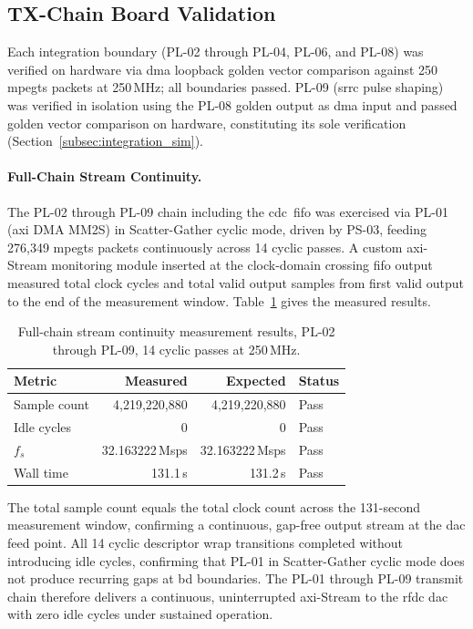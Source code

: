 \subsection{TX-Chain Board Validation}
\label{subsec:txchain_board}

Each integration boundary (PL-02 through PL-04, PL-06, and PL-08)
was verified on hardware via \ac{dma} loopback golden vector
comparison against 250 \ac{mpegts} packets at 250\,MHz; all
boundaries passed.
PL-09 (\ac{srrc} pulse shaping) was verified in isolation using
the PL-08 golden output as \ac{dma} input and passed golden vector
comparison on hardware, constituting its sole verification
(Section~\ref{subsec:integration_sim}).

\FloatBarrier
\paragraph{Full-Chain Stream Continuity.}
\leavevmode\par

The PL-02 through PL-09 chain including the \ac{cdc}~\ac{fifo} was exercised via PL-01 (\ac{axi}
DMA MM2S) in Scatter-Gather cyclic mode, driven by PS-03, feeding
276,349 \ac{mpegts} packets continuously across 14 cyclic passes.
A custom \ac{axi}-Stream monitoring module inserted at the
clock-domain crossing \ac{fifo} output measured total clock cycles
and total valid output samples from first valid output to the end
of the measurement window.
Table~\ref{tab:board_continuity} gives the measured results.

\begin{table}[htbp]
  \caption{Full-chain stream continuity measurement results,
           PL-02 through PL-09, 14 cyclic passes at 250\,MHz.}
  \label{tab:board_continuity}
  \centering
  \small
  \begin{tabular}{lrrl}
    \hline
    Metric & Measured & Expected & Status \\
    \hline
    Sample count & 4,219,220,880  & 4,219,220,880  & Pass \\[2pt]
    Idle cycles  & 0              & 0              & Pass \\[2pt]
    $f_{s}$      & 32.163222\,Msps & 32.163222\,Msps & Pass \\[2pt]
    Wall time    & 131.1\,s       & 131.2\,s       & Pass \\
    \hline
  \end{tabular}
\end{table}

The total sample count equals the total clock count across the
131-second measurement window, confirming a continuous, gap-free
output stream at the \ac{dac} feed point.
All 14 cyclic descriptor wrap transitions completed without
introducing idle cycles, confirming that PL-01 in Scatter-Gather cyclic mode does not
produce recurring gaps at \ac{bd} boundaries.
The PL-01 through PL-09 transmit chain therefore delivers a
continuous, uninterrupted \ac{axi}-Stream to the \ac{rfdc}
\ac{dac} with zero idle cycles under sustained operation.

